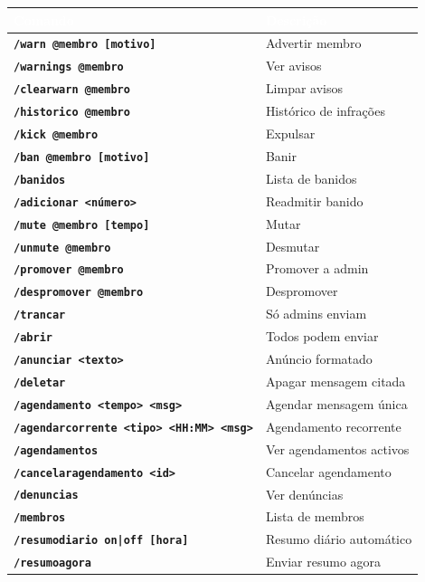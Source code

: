 \documentclass[12pt,a4paper]{article}
\newcommand{\cmd}[1]{\texttt{\textcolor{orbisblue}{\textbf{#1}}}}
\begin{document}
\begin{center}
\begin{longtable}{L{5.5cm} L{7.5cm}}
\toprule
{}\textcolor{white}{\textbf{Comando}} & \textcolor{white}{\textbf{Descrição}} \\
\midrule
\endhead
\cmd{/warn @membro [motivo]} & Advertir membro \\
\cmd{/warnings @membro} & Ver avisos \\
\cmd{/clearwarn @membro} & Limpar avisos \\
\cmd{/historico @membro} & Histórico de infrações \\
\cmd{/kick @membro} & Expulsar \\
\cmd{/ban @membro [motivo]} & Banir \\
\cmd{/banidos} & Lista de banidos \\
\cmd{/adicionar <número>} & Readmitir banido \\
\cmd{/mute @membro [tempo]} & Mutar \\
\cmd{/unmute @membro} & Desmutar \\
\cmd{/promover @membro} & Promover a admin \\
\cmd{/despromover @membro} & Despromover \\
\cmd{/trancar} & Só admins enviam \\
\cmd{/abrir} & Todos podem enviar \\
\cmd{/anunciar <texto>} & Anúncio formatado \\
\cmd{/deletar} & Apagar mensagem citada \\
\cmd{/agendamento <tempo> <msg>} & Agendar mensagem única \\
\cmd{/agendarcorrente <tipo> <HH:MM> <msg>} & Agendamento recorrente \\
\cmd{/agendamentos} & Ver agendamentos activos \\
\cmd{/cancelaragendamento <id>} & Cancelar agendamento \\
\cmd{/denuncias} & Ver denúncias \\
\cmd{/membros} & Lista de membros \\
\cmd{/resumodiario on|off [hora]} & Resumo diário automático \\
\cmd{/resumoagora} & Enviar resumo agora \\

\end{longtable}
\end{center}
\end{document}
